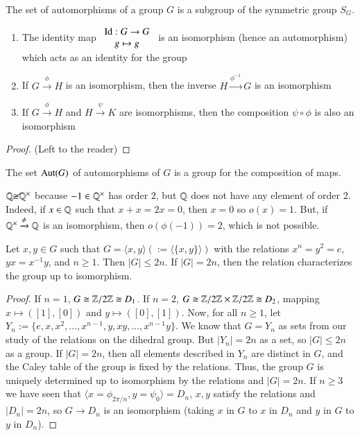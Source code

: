 \begin{proposition}
    The set of automorphisms of a group $G$ is a subgroup of the symmetric group $S_G$.\begin{enumerate}
        \item The identity map $\begin{array}{c} \operatorname{Id}:G\rightarrow G \\ g\mapsto g \end{array}$ is an isomorphism (hence an automorphism) which acts as an identity for the group
        \item If $G\xrightarrow{\phi}H$ is an isomorphism, then the inverse $H\xrightarrow{\phi^{-1}}G$ is an isomorphism
        \item If $G\xrightarrow{\phi}H$ and $H\xrightarrow{\psi}K$ are isomorphisms, then the composition $\psi \circ \phi$ is also an isomorphism
    \end{enumerate}
\end{proposition}
\begin{proof}
    (Left to the reader)
\end{proof}

\begin{corollary}
    The set $\operatorname{Aut}(G)$ of automorphisms of $G$ is a group for the composition of maps.
\end{corollary}

\begin{example}
    $\mathbb Q\cancel{\cong} \mathbb Q^{\times}$ because $-1 \in \mathbb Q^{\times}$ has order $2$, but $\mathbb Q$ does not have any element of order $2$. Indeed, if $x \in \mathbb Q$ such that $x+x=2x = 0$, then $x = 0$ so $o(x) = 1$. But, if $\mathbb Q^{\times}\xrightarrow{\phi}\mathbb Q$ is an isomorphism, then $o(\phi(-1)) = 2$, which is not possible.
\end{example}

\begin{theorem}
    Let $x,y \in G$ such that $G = \langle x,y \rangle (:= \langle \{x,y\}\rangle)$ with the relations $x^n = y^2 = e$, $yx = x^{-1}y$, and $n \geq 1$. Then $|G| \leq 2n$. If $|G| = 2n$, then the relation characterizes the group up to isomorphism.
\end{theorem}
\begin{proof}
    If $n = 1$, $G \cong \mathbb Z/2\mathbb Z \cong D_1$. If $n = 2$, $G \cong \mathbb Z/2\mathbb Z \times \mathbb Z/2\mathbb Z \cong D_2$, mapping $x \mapsto ([1],[0])$ and $y \mapsto ([0],[1])$. Now, for all $n \geq 1$, let $Y_n := \{e,x,x^2,...,x^{n-1},y,xy,...,x^{n-1}y\}$. We know that $G = Y_n$ as sets from our study of the relations on the dihedral group. But $|Y_n| = 2n$ as a set, so $|G| \leq 2n$ as a group. If $|G| = 2n$, then all elements described in $Y_n$ are distinct in $G$, and the Caley table of the group is fixed by the relations. Thus, the group $G$ is uniquely determined up to isomorphism by the relations and $|G| = 2n$. If $n \geq 3$ we have seen that $\langle x = \phi_{2\pi/n},y = \psi_0\rangle = D_n$, $x,y$ satisfy the relations and $|D_n| = 2n$, so $G \rightarrow D_n$ is an isomorphism (taking $x$ in $G$ to $x$ in $D_n$ and $y$ in $G$ to $y$ in $D_n$).
\end{proof}


